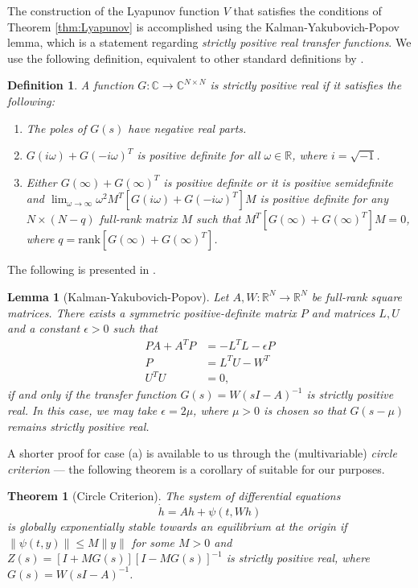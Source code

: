 \documentclass{article} \usepackage{iclr2021_conference,times}
\newtheorem{theorem}{Theorem}
\newtheorem{definition}{Definition}
\newtheorem{lemma}{Lemma}
\begin{document}
The construction of the Lyapunov function $V$ that satisfies the conditions of Theorem \ref{thm:Lyapunov} is accomplished using the Kalman-Yakubovich-Popov lemma, which is a statement regarding \emph{strictly positive real transfer functions}. We use the following definition, equivalent to other standard definitions by \cite[Lemma 6.1]{khalil2002nonlinear}.
\begin{definition}
A function $G:\mathbb{C} \to \mathbb{C}^{N\times N}$ is \emph{strictly positive real} if it satisfies the following:
\begin{enumerate}[label=(\roman*)]
    \item The poles of $G(s)$ have negative real parts.
    \item $G(i\omega) + G(-i\omega)^T$ is positive definite for all $\omega \in \mathbb{R}$, where $i = \sqrt{-1}$.
    \item Either $G(\infty) + G(\infty)^T$ is positive definite or it is positive semidefinite and $\lim_{\omega\to\infty} \omega^2 M^T [G(i\omega)+G(-i\omega)^T]M$ is positive definite for any $N \times (N - q)$ full-rank matrix $M$ such that $M^T[G(\infty)+G(\infty)^T] M = 0$, where $q = \mathrm{rank}[G(\infty)+G(\infty)^T]$.
\end{enumerate}
\end{definition}
The following is presented in \cite[Lemma 6.3]{khalil2002nonlinear}. 
\begin{lemma}[Kalman-Yakubovich-Popov]
\label{lem:KYP}
Let $A,W:\mathbb{R}^N \to \mathbb{R}^N$ be full-rank square matrices. There exists a symmetric positive-definite matrix $P$ and matrices $L,U$ and a constant $\epsilon > 0$ such that
\begin{align*}
PA + A^T P &= -L^T L - \epsilon P \\
P &= L^T U - W^T \\
U^T U &= 0,
\end{align*}
if and only if the \emph{transfer function} $G(s) = W(sI-A)^{-1}$ is strictly positive real. In this case, we may take $\epsilon = 2\mu$, where $\mu > 0$ is chosen so that $G(s - \mu)$ remains strictly positive real. 
\end{lemma}
A shorter proof for case (a) is available to us through the (multivariable) \emph{circle criterion} --- the following theorem is a corollary of \cite[Theorem 7.1]{khalil2002nonlinear} suitable for our purposes.
\begin{theorem}[Circle Criterion]
\label{thm:CircleCriterion}
The system of differential equations
\[
\dot{h} = A h + \psi(t, W h)
\]
is globally exponentially stable towards an equilibrium at the origin if $\|\psi(t,y)\| \leq M\|y\|$ for some $M > 0$ and
$
Z(s) = [I + M G(s)][I - M G(s)]^{-1}
$
is strictly positive real, where $G(s) = W(sI - A)^{-1}$. 
\end{theorem}
\end{document}

